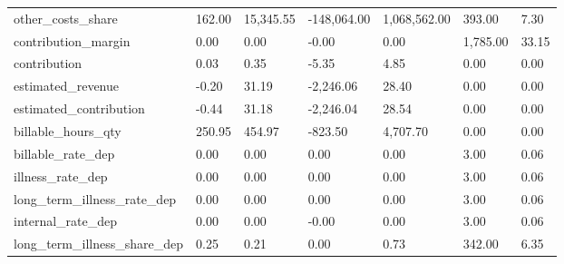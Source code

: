 \begin{landscape}
\begin{longtable}[h!]{lllllll}
other_costs_share & 162.00 & 15,345.55 & -148,064.00 & 1,068,562.00 & 393.00 & 7.30 \\
contribution_margin & 0.00 & 0.00 & -0.00 & 0.00 & 1,785.00 & 33.15 \\
contribution & 0.03 & 0.35 & -5.35 & 4.85 & 0.00 & 0.00 \\
estimated_revenue & -0.20 & 31.19 & -2,246.06 & 28.40 & 0.00 & 0.00 \\
estimated_contribution & -0.44 & 31.18 & -2,246.04 & 28.54 & 0.00 & 0.00 \\
billable_hours_qty & 250.95 & 454.97 & -823.50 & 4,707.70 & 0.00 & 0.00 \\
billable_rate_dep & 0.00 & 0.00 & 0.00 & 0.00 & 3.00 & 0.06 \\
illness_rate_dep & 0.00 & 0.00 & 0.00 & 0.00 & 3.00 & 0.06 \\
long_term_illness_rate_dep & 0.00 & 0.00 & 0.00 & 0.00 & 3.00 & 0.06 \\
internal_rate_dep & 0.00 & 0.00 & -0.00 & 0.00 & 3.00 & 0.06 \\
long_term_illness_share_dep & 0.25 & 0.21 & 0.00 & 0.73 & 342.00 & 6.35 \\
\end{longtable}\end{landscape}
